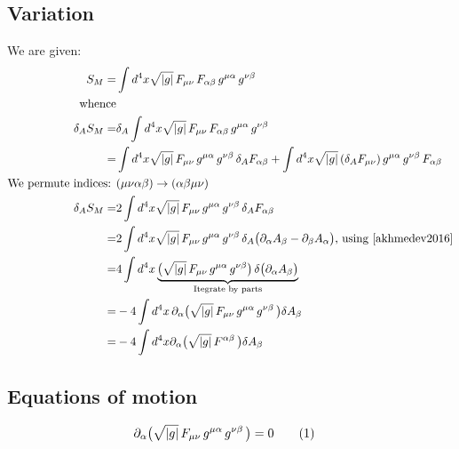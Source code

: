 \documentclass[]{article}
\newcommand\numberthis{\addtocounter{equation}{1}\tag{\theequation}}
\begin{document}
\subsection{Variation}
We are given:
\begin{align*}
S_M =& \int d^4x \sqrt{|g|} \, F_{\mu\nu}\, F_{\alpha\beta} \, g^{\mu\alpha} \, g^{\nu\beta}\\
\text{whence}&\\
\delta_A S_M =& \delta_A \int d^4x \sqrt{|g|} \, F_{\mu\nu}\, F_{\alpha\beta} \, g^{\mu\alpha} \, g^{\nu\beta} \\
=&  \int d^4x \sqrt{|g|} \, F_{\mu\nu} \, g^{\mu\alpha} \, g^{\nu\beta} \, \delta_A F_{\alpha\beta} + \int d^4x \sqrt{|g|} \, (\delta_A F_{\mu\nu}) \, g^{\mu\alpha} \, g^{\nu\beta} \,  F_{\alpha\beta}\\
\text{We permute indices: }& (\mu\nu\alpha\beta)\rightarrow(\alpha\beta\mu\nu)\\
\delta_A S_M=& 2 \int d^4x \sqrt{|g|} \, F_{\mu\nu} \, g^{\mu\alpha} \, g^{\nu\beta} \, \delta_A F_{\alpha\beta} \\
=& 2 \int d^4x \sqrt{|g|} \, F_{\mu\nu} \, g^{\mu\alpha} \, g^{\nu\beta} \, \delta_A \big(\partial_\alpha A_\beta - \partial_\beta A_\alpha\big) \text{,  using \cite[(88)]{akhmedev2016}}\\
=& 4 \int d^4x \underbrace{\big(\sqrt{|g|} \, F_{\mu\nu} \, g^{\mu\alpha} \, g^{\nu\beta}\big) \, \delta \big(\partial_\alpha A_\beta \big)}_\text{Itegrate by parts}\\
=& -4 \int d^4x \, \partial_\alpha \big(\sqrt{|g|} \, F_{\mu\nu} \, g^{\mu\alpha} \, g^{\nu\beta} \,\big) \delta A_\beta\\
=& -4 \int d^4x \partial_\alpha \big(\sqrt{|g|} \, F^{\alpha\beta}  \,\big) \delta A_\beta
\end{align*}
\subsection{Equations of motion}
\begin{align*}
\partial_\alpha \big(\sqrt{|g|} \, F_{\mu\nu} \, g^{\mu\alpha} \, g^{\nu\beta} \,\big) &= 0 \numberthis \label{eq:eom} 
\end{align*}
\end{document}
